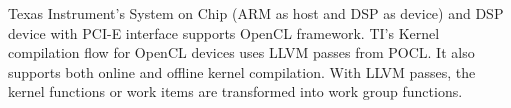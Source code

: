Texas Instrument’s System on Chip (ARM as host and DSP as device)\cite{15} and DSP device with PCI-E interface supports OpenCL framework. TI’s Kernel compilation flow for OpenCL devices uses LLVM passes from POCL. It also supports both online and offline kernel compilation. With LLVM passes, the kernel functions or work items are transformed into work group functions.
